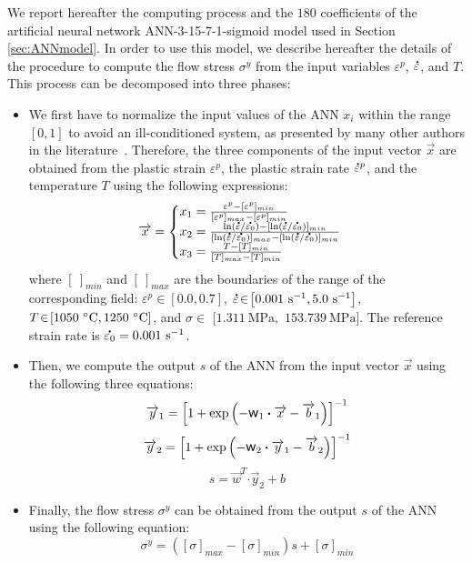 \documentclass[metals,article,accept,pdftex,moreauthors]{Definitions/mdpi}
\DeclareRobustCommand{\w}{\mbox{\large\ensuremath{\mathsf{w}}}}
\DeclareRobustCommand{\dotp}{\boldsymbol{\cdot}}
\DeclareRobustCommand{\mdot}[1]{\accentset{\mbox{\bfseries .}}{#1}}
\DeclareRobustCommand{\ps}{\text{s}^{-1}}
\DeclareRobustCommand{\MPa}{\text{MPa}}
\begin{document}
We report hereafter the computing process and the $180$ coefficients of the artificial neural network ANN-3-15-7-1-sigmoid model used in Section \ref{sec:ANNmodel}.
In order to use this model, we describe hereafter the details of the procedure to compute the flow stress $\sigma^y$ from the input variables $\varepsilon^p$, $\mdot\varepsilon$, and $T$.
This process can be decomposed into three phases:
\begin{itemize}
\item We first have to normalize the input values of the ANN $x_i$ within the range $[0,1]$ to avoid an ill-conditioned system, as presented by many other authors in the literature~\cite{Lin-2008-ANN, stoffel2020deep}.
Therefore, the three components of the input vector $\overrightarrow{x}$ are obtained from the plastic strain $\varepsilon^p$, the plastic strain rate $\mdot{\varepsilon}^p$, and the temperature $T$ using the following expressions:
\begin{equation}
\overrightarrow{x}=
\begin{cases}
x_1 = \frac{\varepsilon^p - [\varepsilon^p]_{min}}{[\varepsilon^p]_{max} - [\varepsilon^p]_{min}}\\
x_2 = \frac{\ln(\mdot{\varepsilon}/\mdot{\varepsilon_0})-[\ln(\mdot{\varepsilon}/\mdot{\varepsilon_0})]_{min}}{[\ln(\mdot{\varepsilon}/\mdot{\varepsilon_0})]_{max}-[\ln(\mdot{\varepsilon}/\mdot{\varepsilon_0})]_{min}}\label{eq:CR1}\\
x_3 = \frac{T-[T]_{min}}{[T]_{max}-[T]_{min}}
\end{cases}
\end{equation}
where $[~]_{min}$ and $[~]_{max}$ are the boundaries of the range of the corresponding field: $\varepsilon^p\!\in\!\left[0.0,0.7\right]$, $\mdot{\varepsilon}\!\in\!\left[0.001~\ps,5.0~\ps\right]$, $T\!\in\!\left[1050~\celsius,1250~\celsius\right]$, and $\sigma\!\in\!$ $[1.311~\MPa,$ $153.739~\MPa]$.
The reference strain rate is $\mdot{\varepsilon_0} = 0.001~\ps$.
\item Then, we compute the output $s$ of the ANN from the input vector $\overrightarrow{x}$ using the following three equations:
\begin{equation}
\overrightarrow{y}_1 = \left[1 + \exp{\left(- \w_1 \dotp \overrightarrow{x}- \overrightarrow{b}_1\right)}\right]^{-1}
\end{equation}
\begin{equation}
\overrightarrow{y}_2 = \left[1 + \exp{\left(- \w_2 \dotp \overrightarrow{y}_1- \overrightarrow{b}_2\right)}\right]^{-1}
\end{equation}
\begin{equation}
s = \overrightarrow{w}^T \dotp \overrightarrow{y}_2 + b
\end{equation}
\item Finally, the flow stress $\sigma^y$ can be obtained from the output $s$ of the ANN using the following equation:
\begin{equation}
\sigma^y = \left([\sigma]_{max}-[\sigma]_{min}\right)s + [\sigma]_{min} \label{eq:CR2}
\end{equation}
\end{itemize}
\end{document}
